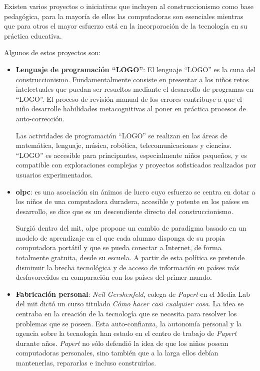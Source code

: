 Existen varios proyectos o iniciativas que incluyen al construccionismo como
base pedagógica, para la mayoría de ellos las computadoras son esenciales
mientras que para otros el mayor esfuerzo está en la incorporación de la
tecnología en su práctica educativa\cite{papertian:const}.

Algunos de estos proyectos son:

\begin{itemize}

\item \textbf{Lenguaje de programación \enquote{LOGO}}: El lenguaje
    \enquote{LOGO} es la cuna del construccionismo. Fundamentalmente consiste en
    presentar a los niños retos intelectuales que puedan ser resueltos mediante
    el desarrollo de programas en \enquote{LOGO}. El proceso de revisión manual de los
    errores contribuye a que el niño desarrolle habilidades metacognitivas al
    poner en práctica procesos de auto-corrección\cite{logo:sg}.

    Las actividades de programación \enquote{LOGO} se realizan en las áreas de
    matemática, lenguaje, música, robótica, telecomunicaciones y ciencias.
    \enquote{LOGO} es accesible para principantes, especialmente niños pequeños,
    y es compatible con exploraciones complejas y proyectos sofisticados
    realizados por usuarios experimentados\cite{logo:sg}.
    
\item \textbf{\Gls{olpc}}: es una asociación sin ánimos de lucro cuyo esfuerzo
    se centra en dotar a los niños de una computadora duradera, accesible y
    potente en los países en desarrollo, se dice que es un descendiente directo
    del construccionismo\cite{papertian:const}.
	
    Surgió dentro del \gls{mit}, \Gls{olpc} propone un cambio de paradigma
    basado en un modelo de aprendizaje en el que cada alumno disponga de su
    propia computadora portátil y que se pueda conectar a Internet, de forma
    totalmente gratuita, desde su escuela. A partir de esta política se pretende
    disminuir la brecha tecnológica y de acceso de información en países más
    desfavorecidos en comparación con los países del primer
    mundo\cite{videojuegos:gonzaleztardon}.
	
\item \textbf{Fabricación personal}: \textit{Neil Gershenfeld}, colega de
    \textit{Papert} en el Media Lab del \Gls{mit} dictó un curso titulado
    \emph{Cómo hacer casi cualquier cosa}. La idea se centraba en la creación de
    la tecnología que se necesita para resolver los problemas que se poseen.
    Esta auto-confianza, la autonomía personal y la agencia sobre la tecnología
    han estado en el centro de trabajo de \textit{Papert} durante años.
    \textit{Papert} no sólo defendió la idea de que los niños posean
    computadoras personales, sino también que a la larga ellos debían
    mantenerlas, repararlas e incluso construirlas.


\end{itemize}
